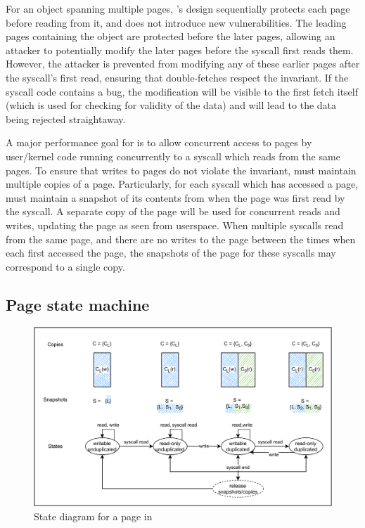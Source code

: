 \documentclass[letterpaper,twocolumn,10pt, anonymous]{article}
\begin{document}
For an object spanning multiple pages, \tiktok's design sequentially 
protects each page before reading from it, and does not introduce 
new vulnerabilities.
The leading pages containing the object are protected before the
later pages, allowing an attacker to potentially modify the later 
pages before the syscall first reads them.
However, the attacker is prevented from modifying any of these earlier pages
after the syscall's first read, ensuring that double-fetches respect
the invariant.
If the syscall code contains a \tocttou bug, the modification will
be visible to the first fetch itself (which is used for checking for 
validity of the data) and will lead to the data being rejected 
straightaway.

A major performance goal for \tiktok is to allow concurrent access to pages
by user/kernel code running concurrently to a syscall which reads from 
the same pages.
To ensure that writes to pages do not violate the invariant, \tiktok
must maintain multiple copies of a page.
Particularly, for each syscall which has accessed a page, \tiktok
must maintain a snapshot of its contents from when the page was first 
read by the syscall.
A separate copy of the page will be used for concurrent reads and writes,
updating the page as seen from userspace.
When multiple syscalls read from the same page, and there are no writes
to the page between the times when each first accessed the page, 
the snapshots of the page for these syscalls may correspond to a 
single copy.

\subsection{Page state machine}

\begin{figure}[]
  \includegraphics[width=\linewidth]{img/tiktok_states.pdf}
  \caption{State diagram for a page in \tiktok}
  \label{fig:tiktok_states}
\end{figure}
\end{document}

